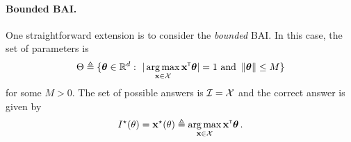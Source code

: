



\paragraph{Bounded BAI.}\label{sec:lgc.formulation.examples.bounded}

One straightforward extension is to consider the \emph{bounded} BAI. In this case, the set of parameters is 
\[
    \Theta \eqdef \{\btheta \in \R^d:\ |\argmax_{\bx\in\cX} \bx\transpose\btheta|=1 \text{ and } \normm{\btheta}\leq M\}
\]
for some $M>0$. The set of possible answers is $\mathcal{I} = \mathcal{X}$ and the correct answer is given by 
\[
    I^\star(\theta) = {\bf x}^\star(\theta) \triangleq \operatorname*{arg\,max}_{{\bf x}\in\mathcal{X}} {\bf x}^\mathsf{\scriptscriptstyle T}{\boldsymbol \theta}\,.
\]

